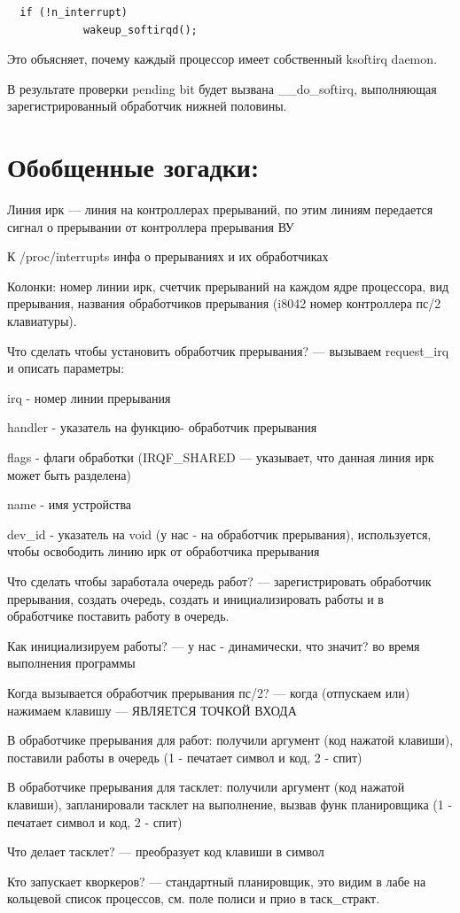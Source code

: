 \begin{lstlisting}
  if (!n_interrupt)
            wakeup_softirqd();
\end{lstlisting}

Это объясняет, почему каждый процессор имеет собственный ksoftirq daemon. 

В результате проверки pending bit будет вызвана \_\_do\_softirq, выполняющая зарегистрированный обработчик нижней половины.

\section*{Обобщенные зогадки:}

Линия ирк --- линия на контроллерах прерываний, по этим линиям передается сигнал о прерывании от контроллера прерывания ВУ

К /proc/interrupts инфа о прерываниях и их обработчиках

Колонки: номер линии ирк, счетчик прерываний на каждом ядре процессора, вид прерывания, названия обработчиков прерывания (i8042 номер контроллера пс/2 клавиатуры).

Что сделать чтобы установить обработчик прерывания? --- вызываем request\_irq и описать параметры: 

irq - номер линии прерывания

handler - указатель на функцию- обработчик прерывания

flags - флаги обработки (IRQF\_SHARED --- указывает, что данная линия ирк может быть разделена)

name - имя устройства

dev\_id - указатель на void (у нас - на обработчик прерывания), используется, чтобы освободить линию ирк от обработчика прерывания

Что сделать чтобы заработала очередь работ? --- зарегистрировать обработчик прерывания, создать очередь, создать и инициализировать работы и в обработчике поставить работу в очередь.

Как инициализируем работы? --- у нас - динамически, что значит? во время выполнения программы

Когда вызывается обработчик прерывания пс/2? --- когда (отпускаем или) нажимаем клавишу --- ЯВЛЯЕТСЯ ТОЧКОЙ ВХОДА

В обработчике прерывания для работ: получили аргумент (код нажатой клавиши), поставили работы в очередь (1 - печатает символ и код, 2 - спит)

В обработчике прерывания для тасклет: получили аргумент (код нажатой клавиши), запланировали тасклет на выполнение, вызвав функ планировщика (1 - печатает символ и код, 2 - спит)

Что делает тасклет? --- преобразует код клавиши в символ

Кто запускает кворкеров? --- стандартный планировщик, это видим в лабе на кольцевой список процессов, см. поле полиси и прио в таск\_стракт.





